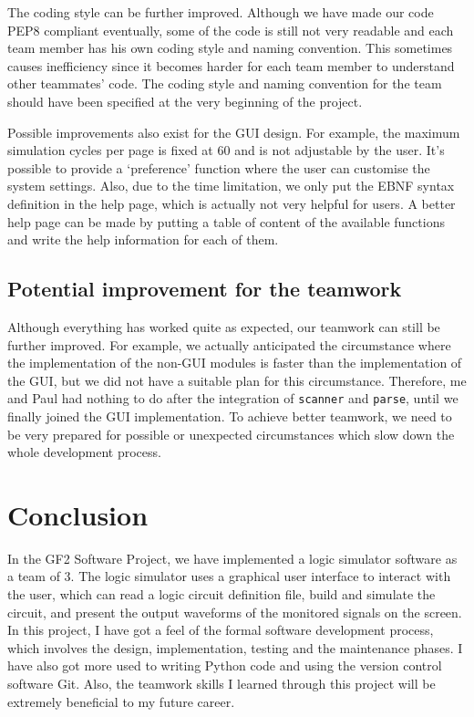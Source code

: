 \documentclass[10pt,a4paper]{article}
\begin{document}
The coding style can be further improved. Although we have made our
code PEP8 compliant eventually, some of the code is still not very
readable and each team member has his own coding style and naming
convention. This sometimes causes inefficiency since it becomes harder
for each team member to understand other teammates' code. The coding
style and naming convention for the team should have been specified at
the very beginning of the project.

Possible improvements also exist for the GUI design. For example, the
maximum simulation cycles per page is fixed at 60 and is not
adjustable by the user. It's possible to provide a `preference'
function where the user can customise the system settings. Also, due
to the time limitation, we only put the EBNF syntax definition in the
help page, which is actually not very helpful for users. A better help
page can be made by putting a table of content of the available
functions and write the help information for each of them.

\subsection{Potential improvement for the teamwork}
\label{sec:org716edfa}

Although everything has worked quite as expected, our teamwork can
still be further improved. For example, we actually anticipated the
circumstance where the implementation of the non-GUI modules is faster
than the implementation of the GUI, but we did not have a suitable
plan for this circumstance. Therefore, me and Paul had nothing to do
after the integration of \texttt{scanner} and \texttt{parse}, until we finally
joined the GUI implementation. To achieve better teamwork, we need to
be very prepared for possible or unexpected circumstances which slow
down the whole development process.

\section{Conclusion}
\label{sec:org0566521}

In the GF2 Software Project, we have implemented a logic simulator
software as a team of 3. The logic simulator uses a graphical user
interface to interact with the user, which can read a logic circuit
definition file, build and simulate the circuit, and present the
output waveforms of the monitored signals on the screen. In this
project, I have got a feel of the formal software development process,
which involves the design, implementation, testing and the maintenance
phases. I have also got more used to writing Python code and using the
version control software Git. Also, the teamwork skills I learned
through this project will be extremely beneficial to my future career.
\end{document}
